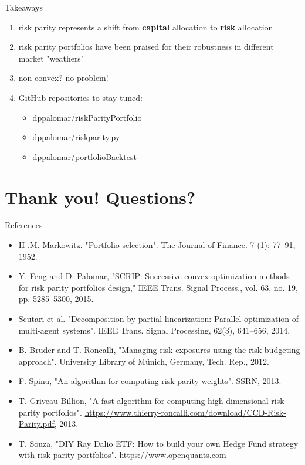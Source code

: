 \documentclass{beamer}
\begin{document}
\begin{frame}{Takeaways}
  \vspace{.5cm}
  \begin{enumerate}
    \item risk parity represents a shift from \textbf{capital} allocation to \textbf{risk} allocation
            \pause
        \vspace{.25cm}
    \item risk parity portfolios have been praised for their robustness in different market "weathers"
            \pause
        \vspace{.25cm}
    \item non-convex? no problem!
            \pause
        \vspace{.25cm}
    \item GitHub repositories to stay tuned:
      \begin{itemize}
        \item dppalomar/riskParityPortfolio
        \item dppalomar/riskparity.py
        \item dppalomar/portfolioBacktest
      \end{itemize}
  \end{enumerate}
\end{frame}

\section{Thank you! Questions?}

\begin{frame}{References}
  \vspace{.5cm}
  \begin{itemize}
    \item {\footnotesize H .M. Markowitz. "Portfolio selection". The Journal of Finance. 7 (1): 77–91, 1952.}
    \item {\footnotesize Y. Feng and D. Palomar, "SCRIP: Successive convex optimization methods for risk parity portfolios design,"
           IEEE Trans. Signal Process., vol. 63, no. 19, pp. 5285–5300, 2015.}
    \item {\footnotesize Scutari et al. "Decomposition by partial linearization: Parallel optimization of multi-agent systems".
           IEEE Trans. Signal Processing, 62(3), 641–656, 2014.}
    \item {\footnotesize B. Bruder and T. Roncalli, "Managing risk exposures using the risk budgeting approach".
           University Library of M\"unich, Germany, Tech. Rep., 2012.}
    \item {\footnotesize F. Spinu, "An algorithm for computing risk parity weights". SSRN, 2013.}
    \item {\footnotesize T. Griveau-Billion, "A fast algorithm for computing high-dimensional risk parity portfolios".
           \url{https://www.thierry-roncalli.com/download/CCD-Risk-Parity.pdf}, 2013.}
    \item {\footnotesize T. Souza, "DIY Ray Dalio ETF: How to build your own Hedge Fund strategy with risk parity portfolios".
           \url{https://www.openquants.com}}
  \end{itemize}
\end{frame}
\end{document}
